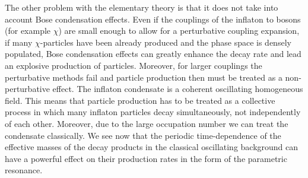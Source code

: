 \documentclass[11pt,a4paper,twoside]{book}
\begin{document}
The other problem with the elementary theory  is that it does not take into account  Bose condensation effects. Even if the couplings of the inflaton to bosons (for example $ \chi $) are small enough to allow for a perturbative coupling expansion, if many $\chi$-particles have been already produced and the phase space is densely populated, Bose condensation effects can greatly enhance the decay rate and lead an explosive production of particles. Moreover, for larger couplings the perturbative methods fail and  particle production then must be treated as a non-perturbative effect. The inflaton condensate is a coherent oscillating homogeneous field. This means that particle production has to be treated as a collective process in which many inflaton particles decay simultaneously, not independently of each other. Moreover, due to the large occupation number we can treat the condensate classically. We see now that the periodic time-dependence of the effective masses of the decay products in the classical oscillating background can have a powerful effect on their production rates in the form of the parametric resonance.
\end{document}

